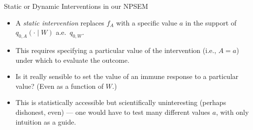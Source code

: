 \documentclass{beamer}
\begin{document}
\begin{frame}[c]{Static or Dynamic Interventions in our NPSEM}

\begin{center}
\begin{itemize}
  \itemsep10pt
  \item A \textit{static intervention} replaces $f_A$ with a specific value $a$
    in the support of $q_{0, A}(\cdot \mid W)$ a.e.~$q_{0,W}$.
  \item This requires specifying a particular value of the intervention (i.e.,
    $A = a$) under which to evaluate the outcome.
  \item Is it really sensible to set the value of an immune response to a
    particular value? (Even as a function of $W$.)
  \item This is statistically accessible but scientifically uninteresting
    (perhaps dishonest, even) --- one would have to test many different values
    $a$, with only intuition as a guide.
\end{itemize}
\end{center}


\end{frame}


\end{document}
